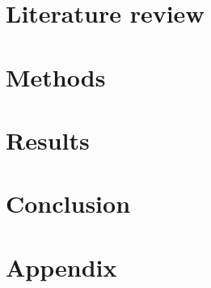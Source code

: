 \documentclass{./styles/UoYCSproject}
\begin{document}
\chapter{Literature review}
\label{ch:litreview}


\chapter{Methods}
\label{ch:methods}

\chapter{Results}
\label{ch:results}

\chapter{Conclusion}
\label{ch:conclusion}


\appendix
\chapter{Appendix}
\label{ch:appendix}

\printbibliography
\end{document}
